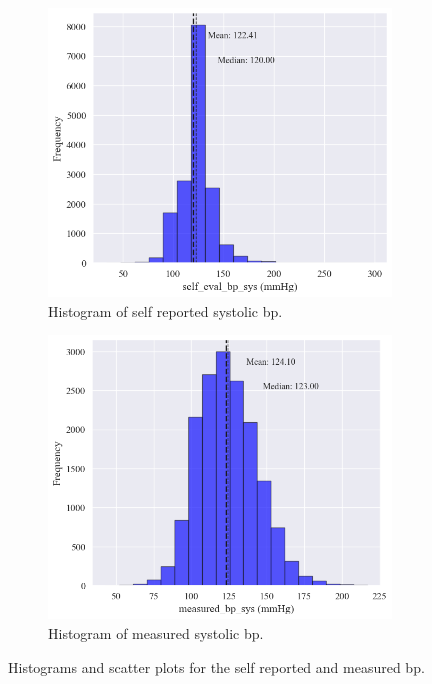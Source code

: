 \documentclass[12 pt]{scrartcl}
\numberwithin{equation}{section}
\begin{document}
\begin{figure}[H]
    \begin{subfigure}[b]{0.45\textwidth}
        \includegraphics[width=\textwidth]{images/hist-self-reported-sys.png}
        \caption{Histogram of self reported systolic bp.}
        \label{fig:subplot3}
    \end{subfigure}
    \hfill
    \begin{subfigure}[b]{0.45\textwidth}
        \includegraphics[width=\textwidth]{images/hist-measured-sys.png}
        \caption{Histogram of measured systolic bp.}
        \label{fig:subplot4}
    \end{subfigure}
    \caption{Histograms and scatter plots for the self reported and measured bp.}
    \label{fig:overall-bp}
\end{figure}
\end{document}
